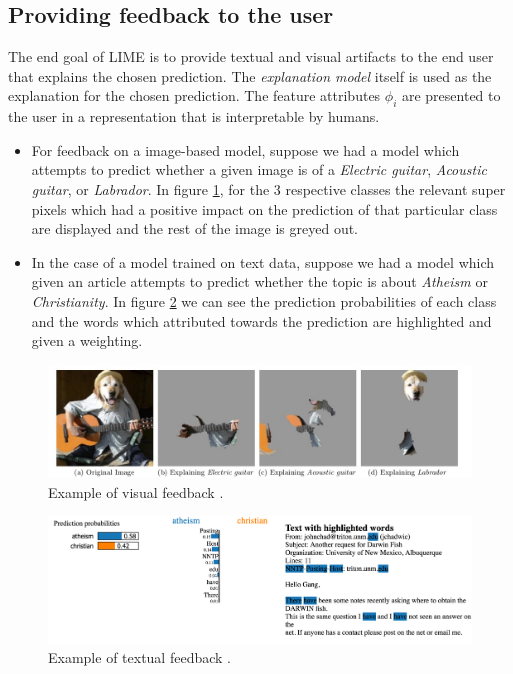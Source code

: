 \subsection{Providing feedback to the user}
The end goal of LIME is to provide textual and visual artifacts to the end user that explains the chosen prediction. The \emph{explanation model} itself is used as the explanation for the chosen prediction. The feature attributes $\phi_{i}$ are presented to the user in a representation that is interpretable by humans.
\begin{itemize}
\item For  feedback on a image-based model, suppose we had a model which attempts to predict whether a given image is of a \emph{Electric guitar}, \emph{Acoustic guitar}, or \emph{Labrador}. In figure \ref{fig:lime-visual-feedback}, for the 3 respective classes the relevant super pixels which had a positive impact on the prediction of that particular class are displayed and the rest of the image is greyed out.
\item In the case of a model trained on text data, suppose we had a model which given an article attempts to predict whether the topic is about \emph{Atheism} or \emph{Christianity}. In figure \ref{fig:lime-textual-feedback} we can see the prediction probabilities of each class and the words which attributed towards the prediction are highlighted and given a weighting.
\end{itemize}

\begin  {figure}[!htpb]
  \includegraphics[width=\linewidth]{Evaluation_Images/Lime_visual_representation.jpg}
  \caption{Example of visual feedback \cite{lime}. }
  \label{fig:lime-visual-feedback}
\end{figure}

\begin  {figure}[!htpb]
  \includegraphics[width=\linewidth]{Evaluation_Images/Lime_text_represntation.png}
  \caption{Example of textual feedback \cite{Https://github.com/marcotcr/lime}.}
  \label{fig:lime-textual-feedback}
\end{figure}

